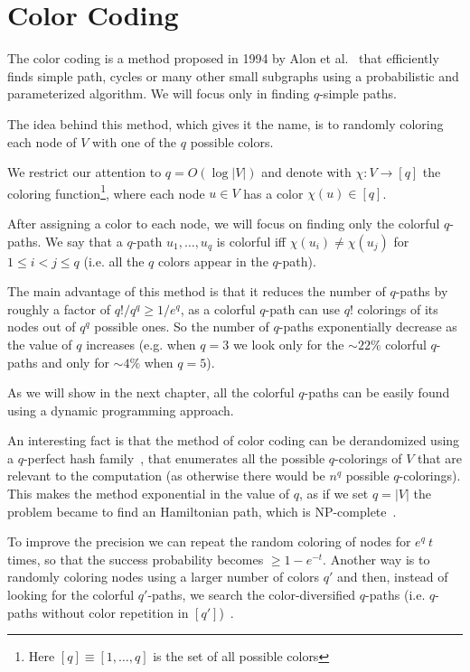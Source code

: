\section{Color Coding}

The color coding is a method proposed in 1994 by Alon et al.~\cite{Alon:1995:COL:210332.210337} that efficiently finds simple path, cycles or many other small subgraphs using a probabilistic and parameterized algorithm. We will focus only in finding $q$-simple paths.\medskip

The idea behind this method, which gives it the name, is to randomly coloring each node of $V$ with one of the $q$ possible colors.

We restrict our attention to $q = O(\log |V|)$ and denote with $\chi : V \rightarrow [q]$ the coloring function\footnote{Here $[q] \equiv [1, \ldots, q]$ is the set of all possible colors}, where each node $u \in V$ has a color $\chi(u) \in [q]$.\medskip

After assigning a color to each node, we will focus on finding only the colorful $q$-paths. We say that a $q$-path $u_{1}, \ldots, u_{q}$ is colorful iff $\chi(u_{i}) \neq \chi(u_{j})$ for $1 \leq i < j \leq q$ (i.e. all the $q$ colors appear in the $q$-path).\medskip

The main advantage of this method is that it reduces the number of $q$-paths by roughly a factor of $q! / q^{q} \geq 1/e^{q}$, as a colorful $q$-path can use $q!$ colorings of its nodes out of $q^{q}$ possible ones. So the number of $q$-paths exponentially decrease as the value of $q$ increases (e.g. when $q = 3$ we look only for the $\sim22\%$ colorful $q$-paths and only for $\sim4\%$ when $q = 5$).\bigskip

As we will show in the next chapter, all the colorful $q$-paths can be easily found using a dynamic programming approach.\medskip

An interesting fact is that the method of color coding can be derandomized using a $q$-perfect hash family~\cite{Alon:1995:COL:210332.210337}, that enumerates all the possible $q$-colorings of $V$ that are relevant to the computation (as otherwise there would be $n^q$ possible $q$-colorings).
This makes the method exponential in the value of $q$, as if we set $q = |V|$ the problem became to find an Hamiltonian path, which is NP-complete~\cite{GareyJohnson:1979}.\medskip

To improve the precision we can repeat the random coloring of nodes for $e^{q}\ t$ times, 
so that the success probability becomes $\geq 1-e^{-t}$. 
Another way is to randomly coloring nodes using a larger number of colors $q'$ and then, instead of looking for the colorful $q'$-paths,
we search the color-diversified $q$-paths (i.e. $q$-paths without color repetition in $[q']$)~\cite{deshpande2007randomized}.\medskip

